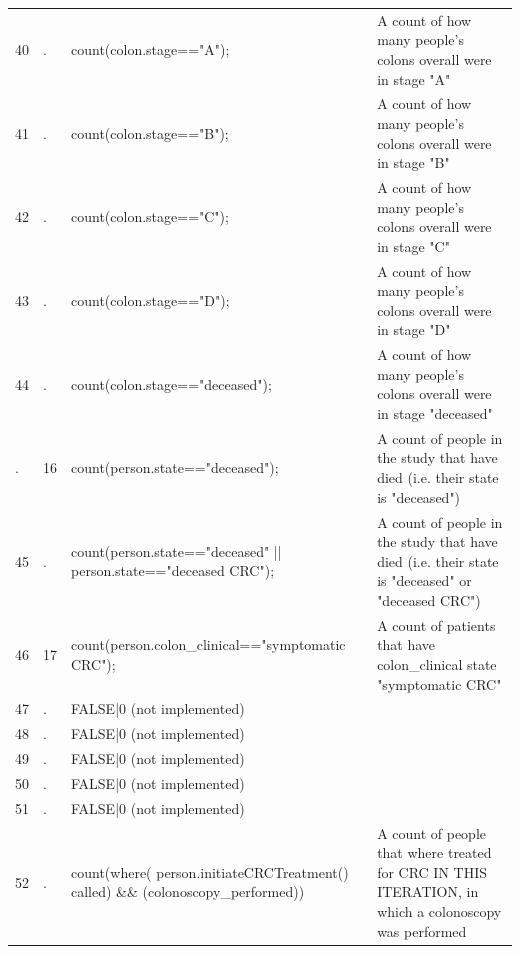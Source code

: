 \documentclass[11pt]{article}
\begin{document}
\begin{landscape}
\begin{longtable}{||l|l|p{11.3cm}|p{11.3cm}||}
40           & .       & count(colon.stage=="A");                                                      & A count of how many people's colons overall were in stage "A" \\
41           & .       & count(colon.stage=="B");                                                      & A count of how many people's colons overall were in stage "B" \\
42           & .       & count(colon.stage=="C");                                                      & A count of how many people's colons overall were in stage "C" \\
43           & .       & count(colon.stage=="D");                                                      & A count of how many people's colons overall were in stage "D" \\
44           & .       & count(colon.stage=="deceased");                                               & A count of how many people's colons overall were in stage "deceased" \\
.            & 16      & count(person.state=="deceased");                                              & A count of people in the study that have died (i.e. their state is "deceased") \\
45           & .       & count(person.state=="deceased" || person.state=="deceased CRC");              & A count of people in the study that have died (i.e. their state is "deceased" or "deceased CRC") \\
46           & 17      & count(person.colon\_clinical=="symptomatic CRC");                              & A count of patients that have colon\_clinical state "symptomatic CRC" \\
47           & .       & FALSE|0 (not implemented)                                                     & \\
48           & .       & FALSE|0 (not implemented)                                                     & \\
49           & .       & FALSE|0 (not implemented)                                                     & \\
50           & .       & FALSE|0 (not implemented)                                                     & \\
51           & .       & FALSE|0 (not implemented)                                                     & \\
52           & .       & count(where( person.initiateCRCTreatment() called)  \&\& (colonoscopy\_performed))  & A count of people that where treated for CRC IN THIS ITERATION, in which a colonoscopy was performed \\

\end{longtable}
\end{landscape}
\end{document}
